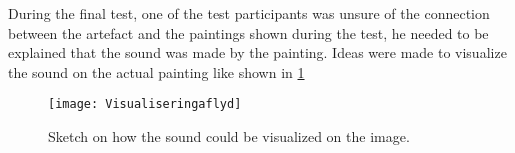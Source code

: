 
During the final test, one of the test participants was unsure of the connection between the artefact and the paintings shown during the test, he needed to be explained that the sound was made by the painting. Ideas were made to visualize the sound on the actual painting like shown in \ref{fig:Visualiseringaflyd} 

\begin{figure}[!h] 
\centering
\texttt{[image: Visualiseringaflyd]}
\caption{\label{fig:Visualiseringaflyd} Sketch on how the sound could be visualized on the image.}
\end{figure}
 
 
